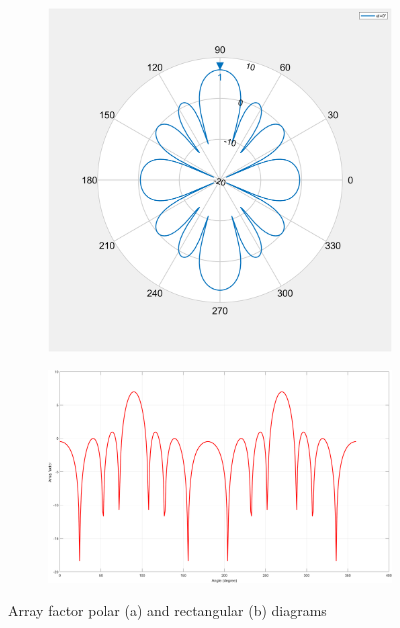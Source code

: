 \documentclass{ieeeojies}
\begin{document}
\begin{center}
	\begin{figure}[t]
			\begin{subfigure}[t]{0.38\textwidth}
  	\includegraphics[width=\textwidth]{array_factor_polar.png}
  	  \subcaption{ }
	\end{subfigure}
	\begin{subfigure}[t]{0.62\textwidth}
		\includegraphics[width=\textwidth]{array_factor_rectangular.png}
  	  \subcaption{ }
	\end{subfigure}
		\caption{ Array factor polar (a) and rectangular (b) diagrams}
	\end{figure}
\end{center}
\end{document}
